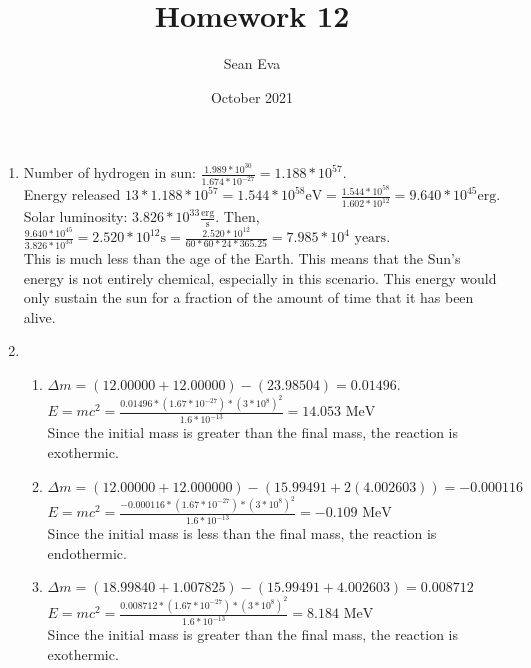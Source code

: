 \documentclass{article}
\title{Homework 12}
\author{Sean Eva}
\date{October 2021}
\begin{document}
\maketitle

\begin{enumerate}
    \item 
    
    Number of hydrogen in sun: $\frac{1.989*10^{30}}{1.674*10^{-27}}=1.188*10^{57}$.\\ Energy released $13*1.188*10^{57} = 1.544*10^{58}\text{eV} = \frac{1.544*10^{58}}{1.602*10^{12}} = 9.640*10^{45}\text{erg}$.\\ Solar luminosity: $3.826*10^{33} \frac{\text{erg}}{\text{s}}$. Then, $\frac{9.640*10^{45}}{3.826*10^{33}} = 2.520*10^{12}\text{s} = \frac{2.520*10^{12}}{60*60*24*365.25} = 7.985*10^4\text{ years}$.\\
    This is much less than the age of the Earth. This means that the Sun's energy is not entirely chemical, especially in this scenario. This energy would only sustain the sun for a fraction of the amount of time that it has been alive.
    \item
    
    \begin{enumerate}
        \item 
        
        $\Delta m = (12.00000+12.00000)-(23.98504) = 0.01496$.\\
        $E = mc^2 = \frac{0.01496*(1.67*10^{-27})*(3*10^8)^2}{1.6*10^{-13}} = 14.053 \text{ MeV}$\\
        Since the initial mass is greater than the final mass, the reaction is exothermic.
        
        \item
        
        $\Delta m = (12.00000+12.000000)-(15.99491+2(4.002603)) = -0.000116$\\
        $E = mc^2 = \frac{-0.000116*(1.67*10^{-27})*(3*10^8)^2}{1.6*10^{-13}} = -0.109 \text{ MeV}$\\
        Since the initial mass is less than the final mass, the reaction is endothermic.
        
        \item
        
        $\Delta m = (18.99840 + 1.007825) - (15.99491 + 4.002603) = 0.008712$\\
        $E = mc^2 = \frac{0.008712*(1.67*10^{-27})*(3*10^8)^2}{1.6*10^{-13}} = 8.184 \text{ MeV}$\\
        Since the initial mass is greater than the final mass, the reaction is exothermic.
        

\end{enumerate}
\end{enumerate}
\end{document}

